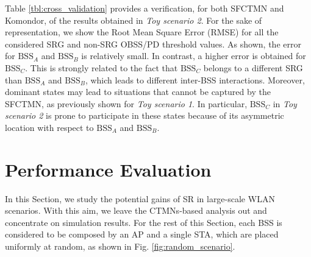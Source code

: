 \documentclass{article}
\begin{document}
Table \ref{tbl:cross_validation} provides a verification, for both SFCTMN and Komondor, of the results obtained in \emph{Toy scenario 2}. For the sake of representation, we show the Root Mean Square Error (RMSE) for all the considered SRG and non-SRG OBSS/PD threshold values. As shown, the error for $\text{BSS}_A$ and $\text{BSS}_B$ is relatively small. In contrast, a higher error is obtained for $\text{BSS}_C$. This is strongly related to the fact that $\text{BSS}_C$ belongs to a different SRG than $\text{BSS}_A$ and $\text{BSS}_B$, which leads to different inter-BSS interactions. Moreover, dominant states may lead to situations that cannot be captured by the SFCTMN, as previously shown for \emph{Toy scenario 1}. In particular, $\text{BSS}_C$ in \emph{Toy scenario 2} is prone to participate in these states because of its asymmetric location with respect to $\text{BSS}_A$ and $\text{BSS}_B$.
\begin{table}[ht!]
	\centering
	\caption{Verification of the results obtained in \emph{Toy scenario 2} from the SFCTMN and Komondor.}
	\label{tbl:cross_validation}
\end{table}


\section{Performance Evaluation}
\label{section:performance_evaluation}

In this Section, we study the potential gains of SR in large-scale WLAN scenarios. With this aim, we leave the CTMNs-based analysis out and concentrate on simulation results. For the rest of this Section, each BSS is considered to be composed by an AP and a single STA, which are placed uniformly at random, as shown in Fig. \ref{fig:random_scenario}. 
\end{document}
